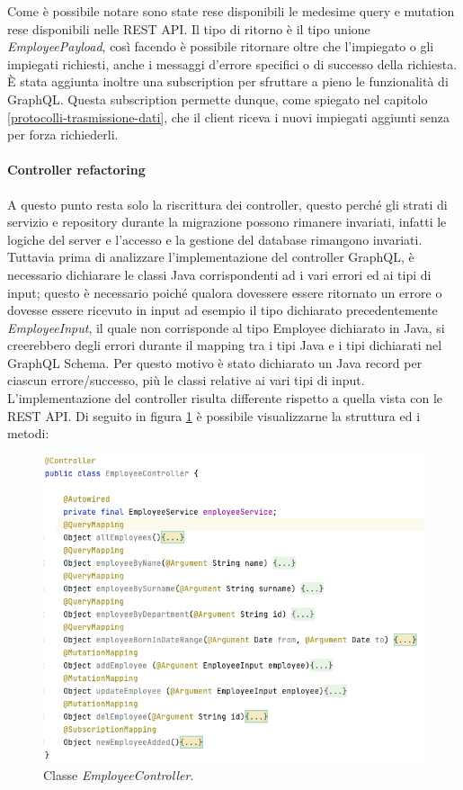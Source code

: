 \FloatBarrier
Come è possibile notare sono state rese disponibili le medesime query e mutation rese disponibili nelle REST API. Il tipo di ritorno è il tipo unione \textit{EmployeePayload}, così facendo è possibile ritornare oltre che l'impiegato o gli impiegati richiesti, anche i messaggi d'errore specifici o di successo della richiesta.\\
È stata aggiunta inoltre una subscription per sfruttare a pieno le funzionalità di GraphQL. Questa subscription permette dunque, come spiegato nel capitolo \ref{protocolli-trasmissione-dati}, che il client riceva i nuovi impiegati aggiunti senza per forza richiederli.\\

\paragraph{Controller refactoring}
A questo punto resta solo la riscrittura dei controller, questo perché gli strati di servizio e repository durante la migrazione possono rimanere invariati, infatti le logiche del server e l'accesso e la gestione del database rimangono invariati. Tuttavia prima di analizzare l'implementazione del controller GraphQL, è necessario dichiarare le classi Java corrispondenti ad i vari errori ed ai tipi di input; questo è necessario poiché qualora dovessere essere ritornato un errore o dovesse essere ricevuto in input ad esempio il tipo dichiarato precedentemente \textit{EmployeeInput}, il quale non corrisponde al tipo Employee dichiarato in Java, si creerebbero degli errori durante il mapping tra i tipi Java e i tipi dichiarati nel GraphQL Schema. Per questo motivo è stato dichiarato un Java record per ciascun errore/successo, più le classi relative ai vari tipi di input.\\
L'implementazione del controller risulta differente rispetto a quella vista con le REST API. Di seguito in figura \ref{graphql-controller} è possibile visualizzarne la struttura ed i metodi:
\FloatBarrier
\begin{figure}[!ht]
\centering
\includegraphics[width=0.8\linewidth]{immagini/graphQLEmployeeController.png}
\caption{Classe \textit{EmployeeController}.}
\label{graphql-controller}
\end{figure}

